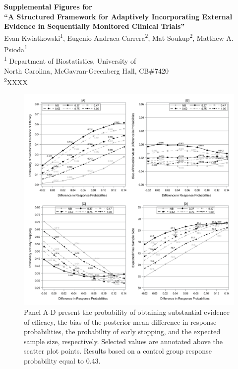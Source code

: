 \documentclass[12pt]{article}
\begin{document}
	\begin{center}
		\textbf{Supplemental Figures for \\ ``A Structured Framework for Adaptively Incorporating External\\ 
		         Evidence in Sequentially Monitored Clinical Trials''} \\

		\vspace{1cm}
			Evan Kwiatkowski\textsuperscript{1}, Eugenio Andraca-Carrera\textsuperscript{2}, 
			Mat Soukup\textsuperscript{2}, Matthew A. Psioda\textsuperscript{1}\\

		\vspace{1cm}
			\textsuperscript{1} Department of Biostatistics, University of \\
			North Carolina, McGavran-Greenberg Hall, CB\#7420 \\

		\vspace{1cm}
			\textsuperscript{2}XXXX
	\end{center}

\renewcommand\thefigure{S\arabic{figure}}   


\newpage
\begin{figure}[h]
		\centering\includegraphics[scale=0.65]{./figures/PLUTO-POWER-2STAGE-FIGC.pdf}  
		\caption{Panel A-D present the probability of obtaining substantial evidence of efficacy,
		         the bias of the posterior mean difference in response probabilities, the probability
						 of early stopping, and the expected sample size, respectively. Selected values
						 are annotated above the scatter plot points. Results based on a control group response
						 probability equal to 0.43.} \label{POWER2}
						
\end{figure}	
\end{document}
